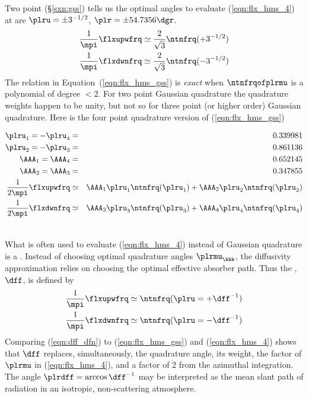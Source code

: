 \documentclass[12pt]{article}
\begin{document}
Two point 
(\S\ref{sxn:gss}) tells us the optimal angles to evaluate 
(\ref{eqn:flx_hms_4}) at are $\plru = \pm 3^{-1/2}$, $\plr = \pm
54.7356\dgr$. 
\begin{subequations}
\label{eqn:flx_hms_gss}
\begin{align}
\label{eqn:flx_hms_gss_a}
\frac{1}{\mpi} \flxupwfrq & \simeq \frac{2}{\sqrt{3}} \ntnfrq (+3^{-1/2}) \\
\label{eqn:flx_hms_gss_b}
\frac{1}{\mpi} \flxdwnfrq & \simeq \frac{2}{\sqrt{3}} \ntnfrq (-3^{-1/2})
\end{align}
\end{subequations} 
The relation in Equation~(\ref{eqn:flx_hms_gss}) is \textit{exact}
when $\ntnfrqofplrmu$ is a polynomial of degree $< 2$.
For two point Gaussian quadrature the quadrature weights happen to
be unity, but not so for three point (or higher order) Gaussian
quadrature.
Here is the four point quadrature version of (\ref{eqn:flx_hms_gss})
\newline\parbox{6in}{ %
\begin{eqnarray}
\plru_{1} = -\plru_{4} & = & 0.339981 \nonumber \\
\plru_{2} = -\plru_{3} & = & 0.861136 \nonumber \\
\AAA_{1} = \AAA_{4} & = & 0.652145 \nonumber \\
\AAA_{2} = \AAA_{3} & = & 0.347855 \nonumber \\
\frac{1}{2 \mpi} \flxupwfrq & \simeq & 
\AAA_{1} \plru_{1} \ntnfrq(\plru_{1}) + \AAA_{2} \plru_{2} \ntnfrq(\plru_{2})
\nonumber \\
\frac{1}{2 \mpi} \flxdwnfrq & \simeq & 
\AAA_{3} \plru_{3} \ntnfrq(\plru_{3}) + \AAA_{4} \plru_{4} \ntnfrq(\plru_{4})
\nonumber
\end{eqnarray} 
}\hfill %
\parbox{1cm}{\begin{eqnarray}\label{eqn:flx_hms_gss_4}\end{eqnarray}}\newline

What is often used to evaluate (\ref{eqn:flx_hms_4}) instead of
Gaussian quadrature is a .  
Instead of choosing optimal quadrature angles $\plrmu_{\kkk}$, the
diffusivity approximation relies on choosing the optimal effective
absorber path.
Thus the , $\dff$, is defined by
\begin{subequations}
\label{eqn:dff_dfn}
\begin{align}
\label{eqn:dff_dfn_a}
\frac{1}{\mpi} \flxupwfrq & \simeq \ntnfrq (\plru = +\dff^{-1}) \\
\label{eqn:dff_dfn_b}
\frac{1}{\mpi} \flxdwnfrq & \simeq \ntnfrq (\plru = -\dff^{-1})
\end{align}
\end{subequations} 
Comparing (\ref{eqn:dff_dfn}) to (\ref{eqn:flx_hms_gss}) and
(\ref{eqn:flx_hms_4}) shows that $\dff$ replaces, simultaneously, the
quadrature angle, its weight, the factor of $\plrmu$ in
(\ref{eqn:flx_hms_4}), and a factor of 2 from the azimuthal
integration. 
The angle $\plrdff = \arccos \dff^{-1}$ may be interpreted as the
mean slant path of radiation in an isotropic, non-scattering
atmosphere. 
\end{document}
